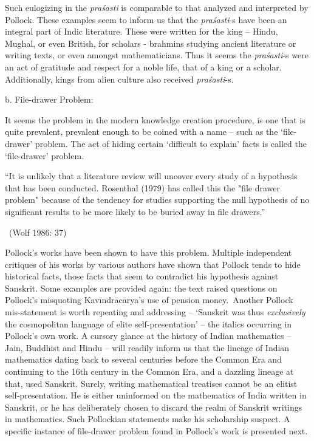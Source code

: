 Such eulogizing in the \textit{praśasti} is comparable to that analyzed and interpreted by Pollock. These examples seem to inform us that the \textit{praśasti}-s have been an integral part of Indic literature. These were written for the king – Hindu, Mughal, or even British, for scholars - brahmins studying ancient literature or writing texts, or even amongst mathematicians. Thus it seems the \textit{praśasti}-s were an act of gratitude and respect for a noble life, that of a king or a scholar. Additionally, kings from alien culture also received \textit{praśasti}-s.

b. File-drawer Problem:

It seems the problem in the modern knowledge creation procedure, is one that is quite prevalent, prevalent enough to be coined with a name – such as the ‘file-drawer’ problem. The act of hiding certain ‘difficult to explain’ facts is called the ‘file-drawer’ problem.

\begin{myquote}
“It is unlikely that a literature review will uncover every study of a hypothesis that has been conducted. Rosenthal (1979) has called this the "file drawer problem" because of the tendency for studies supporting the null hypothesis of no significant results to be more likely to be buried away in file drawers.” 

~\hfill (Wolf 1986: 37)
\end{myquote}

Pollock’s works have been shown to have this problem. Multiple independent critiques of his works by various authors have shown that Pollock tends to hide historical facts, those facts that seem to contradict his hypothesis against Sanskrit. Some examples are provided again: the text raised questions on Pollock’s misquoting Kavīndrācārya’s use of pension money.~Another Pollock mis-statement is worth repeating and addressing – ‘Sanskrit was thus \textit{exclusively} the cosmopolitan language of elite self-presentation’ – the italics occurring in Pollock’s own work. A cursory glance at the history of Indian mathematics – Jain, Buddhist and Hindu – will readily inform us that the lineage of Indian mathematics dating back to several centuries before the Common Era and continuing to the 16th century in the Common Era, and a dazzling lineage at that, used Sanskrit. Surely, writing mathematical treatises cannot be an elitist self-presentation. He is either uninformed on the mathematics of India written in Sanskrit, or he has deliberately chosen to discard the realm of Sanskrit writings in mathematics. Such Pollockian statements make his scholarship suspect. A specific instance of file-drawer problem found in Pollock’s work is presented next.


